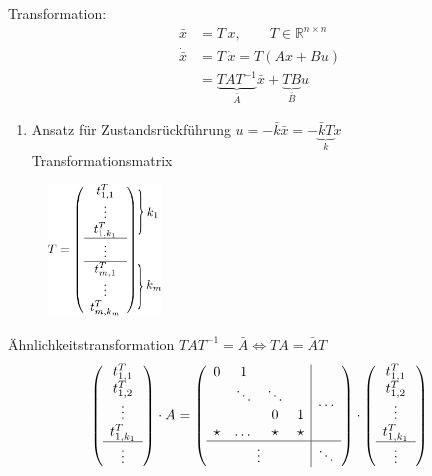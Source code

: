 \documentclass[ngerman]{tudscrreprt}
\begin{document}
Transformation: \begin{align*} \bar x &= T\,x ,\qquad T\in \mathbb{R}^{n\times n}\\ 
\dot{\bar{x}} & = T\,\dot x = T(Ax + Bu)\\ 
&= \underbrace{TAT^{-1}}_{\bar A} \bar x + \underbrace{TB}_{\bar B}u\end{align*} 
\begin{enumerate}
\item Ansatz für Zustandsrückführung $ u = -\bar k \bar x = -\underbrace{\bar k T}_{k} x$\\ 
Transformationsmatrix 
\end{enumerate}
\begin{figure}[H]
\centering
\def\svgwidth{200pt} 
  \includegraphics[width=3cm]{images/Tmatrix.pdf}
\end{figure} Ähnlichkeitstransformation $TAT^{-1} = \bar A \iff TA = \bar A T$
\begin{align*}
\left(
\begin{array}{ c }
t_{1,1}^T \\ t_{1,2}^T \\ \vdots\\ t_{1,k_1}^T\\ \hline \vdots
\end{array}\right)\cdot A = \left(
\begin{array}{ c | c }
\begin{matrix}
0&1 && \\ 
& \ddots&\ddots&\\
&&0&1\\ 
\star&\dots&\star& \star
\end{matrix}& \dots \\ \hline \vdots& \ddots
\end{array}
\right)\cdot \left(
\begin{array}{ c }
t_{1,1}^T \\ t_{1,2}^T \\ \vdots\\ t_{1,k_1}^T\\ \hline \vdots
\end{array}\right)
\end{align*}
\end{document}
